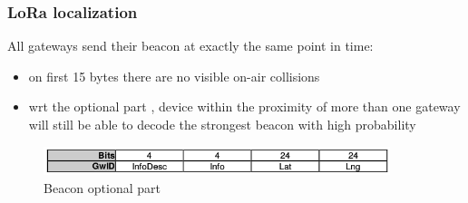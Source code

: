 \begin{frame}[fragile]
  \frametitle{LoRa localization}
  All gateways send their beacon at exactly the same point in time:
  \begin{itemize}
    \item on first 15 bytes there are no visible on-air collisions 
    \item wrt the optional part , device within the proximity of more than one
	  gateway will still be able to decode the strongest beacon with high probability
  \end{itemize}
  \begin{figure}
  \centering
  \includegraphics[width=0.9\textwidth]{img/optional.png}
  \caption{Beacon optional part}
 \end{figure}
  

\end{frame}

